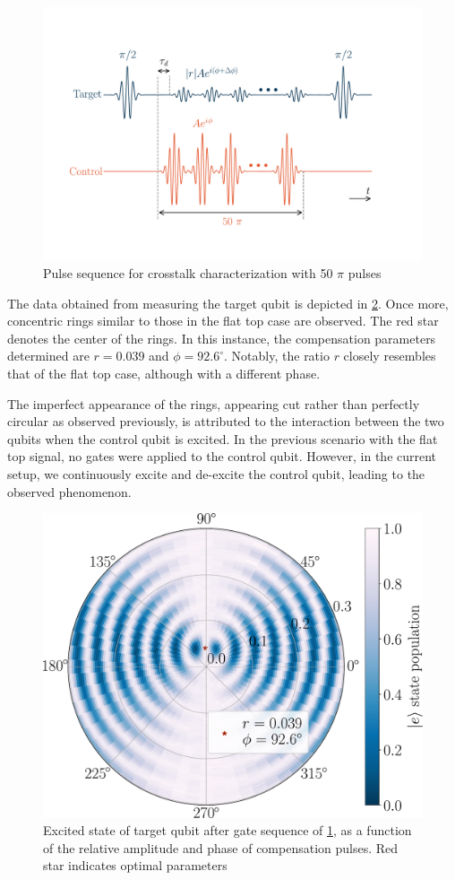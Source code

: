 \begin{figure}
    \centering
    \includegraphics[width=0.85\linewidth]{Images//Chap2.0/diagram_gaussian.pdf}
    \vspace{-1cm}
    \caption{Pulse sequence for crosstalk characterization with 50 $\pi$ pulses}
    \label{train_gauss}
\end{figure}

The data obtained from measuring the target qubit is depicted in \cref{fig:circle_pulsed}.
Once more, concentric rings similar to those in the flat top case are observed.
The red star denotes the center of the rings. 
In this instance, the compensation parameters determined are $r = 0.039$ and $\phi = 92.6^\circ$.
Notably, the ratio $r$ closely resembles that of the flat top case, although with a different phase.

The imperfect appearance of the rings, appearing cut rather than perfectly circular as observed previously, is attributed to the interaction between the two qubits when the control qubit is excited.
In the previous scenario with the flat top signal, no gates were applied to the control qubit. 
However, in the current setup, we continuously excite and de-excite the control qubit, leading to the observed phenomenon.

\begin{figure}
    \centering
    \includegraphics[width=0.8\linewidth]{Images//Chap2.0/circles_pulsed.pdf}
    \caption{Excited state of target qubit after gate sequence of  \cref{train_gauss}, as a function of the relative amplitude and phase of compensation pulses. Red star indicates optimal parameters}
    \label{fig:circle_pulsed}
\end{figure}

